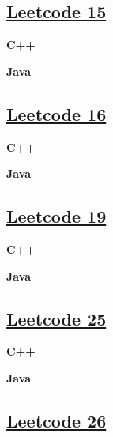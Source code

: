 \subsection{\href{https://leetcode-cn.com/}{Leetcode 15}}\label{app:codelist:leetcode:15}

\textbf{C++}\par


\textbf{Java}\par



\subsection{\href{https://leetcode-cn.com/}{Leetcode 16}}\label{app:codelist:leetcode:16}

\textbf{C++}\par


\textbf{Java}\par



\subsection{\href{https://leetcode-cn.com/}{Leetcode 19}}\label{app:codelist:leetcode:19}

\textbf{C++}\par


\textbf{Java}\par



\subsection{\href{https://leetcode-cn.com/}{Leetcode 25}}\label{app:codelist:leetcode:25}

\textbf{C++}\par


\textbf{Java}\par



\subsection{\href{https://leetcode-cn.com/}{Leetcode 26}}\label{app:codelist:leetcode:26}

